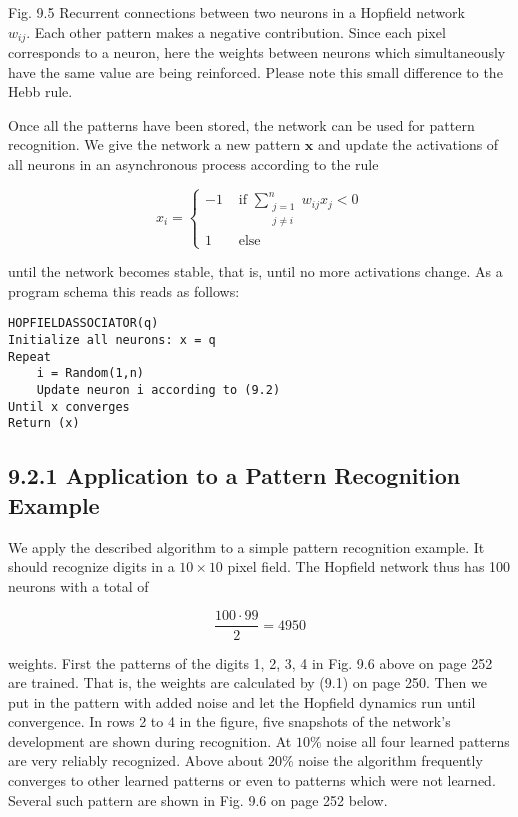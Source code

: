 \documentclass[10pt]{article}
\begin{document}
Fig. 9.5 Recurrent connections between two neurons in a Hopfield network\\
$w_{i j}$. Each other pattern makes a negative contribution. Since each pixel corresponds to a neuron, here the weights between neurons which simultaneously have the same value are being reinforced. Please note this small difference to the Hebb rule.

Once all the patterns have been stored, the network can be used for pattern recognition. We give the network a new pattern $\boldsymbol{x}$ and update the activations of all neurons in an asynchronous process according to the rule

\[
x_{i}= \begin{cases}-1 & \text { if } \sum_{\substack{j=1 \\ j \neq i}}^{n} w_{i j} x_{j}<0  \tag{9.2}\\ 1 & \text { else }\end{cases}
\]

until the network becomes stable, that is, until no more activations change. As a program schema this reads as follows:

\begin{verbatim}
HOPFIELDASSOCIATOR(q)
Initialize all neurons: x = q
Repeat
    i = Random(1,n)
    Update neuron i according to (9.2)
Until x converges
Return (x)
\end{verbatim}

\subsection*{9.2.1 Application to a Pattern Recognition Example}
We apply the described algorithm to a simple pattern recognition example. It should recognize digits in a $10 \times 10$ pixel field. The Hopfield network thus has 100 neurons with a total of

$$
\frac{100 \cdot 99}{2}=4950
$$

weights. First the patterns of the digits 1, 2, 3, 4 in Fig. 9.6 above on page 252 are trained. That is, the weights are calculated by (9.1) on page 250. Then we put in the pattern with added noise and let the Hopfield dynamics run until convergence. In rows 2 to 4 in the figure, five snapshots of the network's development are shown during recognition. At $10 \%$ noise all four learned patterns are very reliably recognized. Above about $20 \%$ noise the algorithm frequently converges to other learned patterns or even to patterns which were not learned. Several such pattern are shown in Fig. 9.6 on page 252 below.
\end{document}

